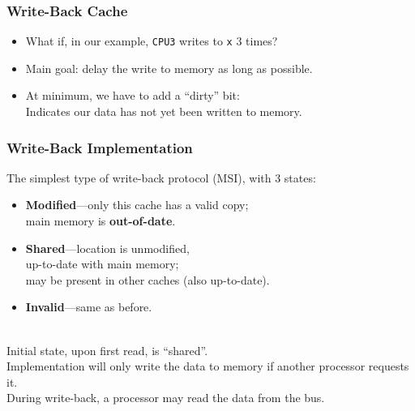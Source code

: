 \begin{frame}
  \frametitle{Write-Back Cache}


  \begin{itemize}
    \item What if, in our example, {\tt CPU3} writes to {\tt x} 3 times?\\[1em]
    \item Main goal: delay the write to memory as long as possible.\\[1em]
    \item At minimum, we have to add a ``dirty'' bit:\\
     \quad Indicates our data has not yet been written to memory.
  \end{itemize}
  

\end{frame}

\begin{frame}
  \frametitle{Write-Back Implementation}

  
     The simplest type of write-back protocol (MSI), with 3 states:
      \begin{itemize}
        \item {\bf Modified}---only this cache has a valid copy; \\
          \quad main memory is {\bf out-of-date}.
        \item {\bf Shared}---location is unmodified, \\
          \quad up-to-date with main
          memory; \\
          \quad may be present in other caches (also up-to-date).
        \item {\bf Invalid}---same as before.
      \end{itemize}~\\
      
     Initial state, upon first read, is ``shared''.\\[1em]

     Implementation will only write the data to memory if another
        processor requests it.\\[1em]

     During write-back, a processor may read the data from the bus.
  
\end{frame}

